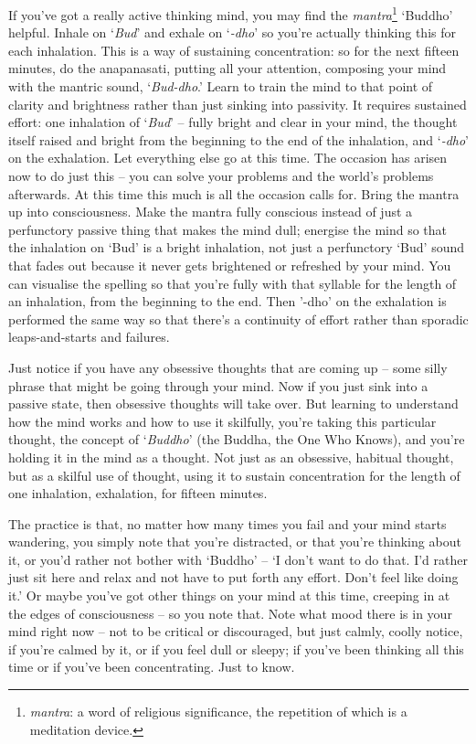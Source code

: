
If you've got a really active thinking mind, you may find the \textit{mantra}\footnote{\textit{mantra}: a word of religious significance, the repetition of which is a meditation device.} `Buddho' helpful. Inhale on `\textit{Bud}' and exhale on `\textit{-dho}' so you're actually thinking this for each inhalation. This is a way of sustaining concentration: so for the next fifteen minutes, do the anapanasati, putting all your attention, composing your mind with the mantric sound, `\textit{Bud-dho}.' Learn to train the mind to that point of clarity and brightness rather than just sinking into passivity. It requires sustained effort: one inhalation of `\textit{Bud}' -- fully bright and clear in your mind, the thought itself raised and bright from the beginning to the end of the inhalation, and `\textit{-dho}' on the exhalation. Let everything else go at this time. The occasion has arisen now to do just this -- you can solve your problems and the world's problems afterwards. At this time this much is all the occasion calls for. Bring the mantra up into consciousness. Make the mantra fully conscious instead of just a perfunctory passive thing that makes the mind dull; energise the mind so that the inhalation on `Bud' is a bright inhalation, not just a perfunctory `Bud' sound that fades out because it never gets brightened or refreshed by your mind. You can visualise the spelling so that you're fully with that syllable for the length of an inhalation, from the beginning to the end. Then '-dho' on the exhalation is performed the same way so that there's a continuity of effort rather than sporadic leaps-and-starts and failures.

Just notice if you have any obsessive thoughts that are coming up -- some silly phrase that might be going through your mind. Now if you just sink into a passive state, then obsessive thoughts will take over. But learning to understand how the mind works and how to use it skilfully, you're taking this particular thought, the concept of `\textit{Buddho}' (the Buddha, the One Who Knows), and you're holding it in the mind as a thought. Not just as an obsessive, habitual thought, but as a skilful use of thought, using it to sustain concentration for the length of one inhalation, exhalation, for fifteen minutes. 

The practice is that, no matter how many times you fail and your mind starts wandering, you simply note that you're distracted, or that you're thinking about it, or you'd rather not bother with `Buddho' -- `I don't want to do that. I'd rather just sit here and relax and not have to put forth any effort. Don't feel like doing it.' Or maybe you've got other things on your mind at this time, creeping in at the edges of consciousness -- so you note that. Note what mood there is in your mind right now -- not to be critical or discouraged, but just calmly, coolly notice, if you're calmed by it, or if you feel dull or sleepy; if you've been thinking all this time or if you've been concentrating. Just to know.

